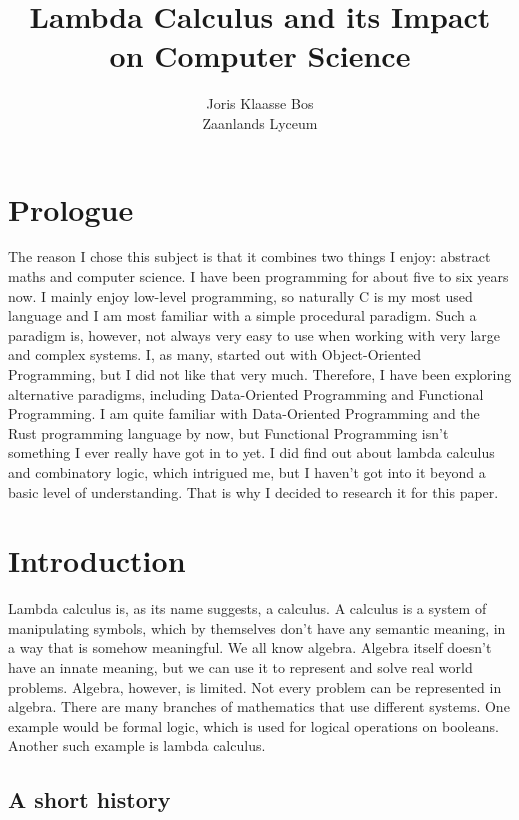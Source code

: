\documentclass[a4paper, 11pt]{article}
\title{Lambda Calculus and its Impact on Computer Science}
\author{Joris Klaasse Bos\\ Zaanlands Lyceum}
\begin{document}
\maketitle

\section{Prologue}

The reason I chose this subject is that it combines two things I enjoy:
abstract maths and computer science. I have been programming for about five to
six years now. I mainly enjoy low-level programming, so naturally C is my most
used language and I am most familiar with a simple procedural paradigm. Such a
paradigm is, however, not always very easy to use when working with very large
and complex systems. I, as many, started out with Object-Oriented Programming,
but I did not like that very much. Therefore, I have been exploring alternative
paradigms, including Data-Oriented Programming and Functional Programming. I am
quite familiar with Data-Oriented Programming and the Rust programming language
by now, but Functional Programming isn't something I ever really have got in to
yet. I did find out about lambda calculus and combinatory logic, which
intrigued me, but I haven’t got into it beyond a basic level of understanding.
That is why I decided to research it for this paper. 

\section{Introduction}


Lambda calculus is, as its name suggests, a calculus. A calculus is a system of
manipulating symbols, which by themselves don't have any semantic meaning, in a
way that is somehow meaningful. We all know algebra. Algebra itself doesn't
have an innate meaning, but we can use it to represent and solve real world
problems. Algebra, however, is limited. Not every problem can be represented in
algebra. There are many branches of mathematics that use different systems.
One example would be formal logic, which is used for logical operations on
booleans. Another such example is lambda calculus.

\subsection{A short history}
\end{document}
